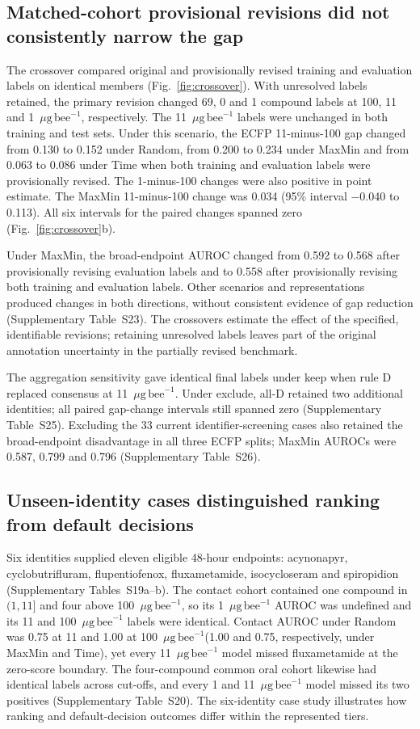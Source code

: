 \documentclass{ieeeaccess}
\newcommand{\ugbee}{\ensuremath{\mu\mathrm{g\,bee}^{-1}}\xspace}
\begin{document}
\subsection{Matched-cohort provisional revisions did not consistently narrow the gap}
The crossover compared original and provisionally revised training and evaluation labels on identical members (Fig.~\ref{fig:crossover}). With unresolved labels retained, the primary revision changed 69, 0 and 1 compound labels at 100, 11 and 1~\ugbee, respectively. The 11~\ugbee labels were unchanged in both training and test sets. Under this scenario, the ECFP 11-minus-100 gap changed from 0.130 to 0.152 under Random, from 0.200 to 0.234 under MaxMin and from 0.063 to 0.086 under Time when both training and evaluation labels were provisionally revised. The 1-minus-100 changes were also positive in point estimate. The MaxMin 11-minus-100 change was 0.034 (95\% interval $-$0.040 to 0.113). All six intervals for the paired changes spanned zero (Fig.~\ref{fig:crossover}b).

Under MaxMin, the broad-endpoint AUROC changed from 0.592 to 0.568 after provisionally revising evaluation labels and to 0.558 after provisionally revising both training and evaluation labels. Other scenarios and representations produced changes in both directions, without consistent evidence of gap reduction (Supplementary Table~S23). The crossovers estimate the effect of the specified, identifiable revisions; retaining unresolved labels leaves part of the original annotation uncertainty in the partially revised benchmark.

The aggregation sensitivity gave identical final labels under keep when rule D replaced consensus at 11~\ugbee. Under exclude, all-D retained two additional identities; all paired gap-change intervals still spanned zero (Supplementary Table~S25). Excluding the 33 current identifier-screening cases also retained the broad-endpoint disadvantage in all three ECFP splits; MaxMin AUROCs were 0.587, 0.799 and 0.796 (Supplementary Table~S26).





\subsection{Unseen-identity cases distinguished ranking from default decisions}
Six identities supplied eleven eligible 48-hour endpoints: acynonapyr, cyclobutrifluram, flupentiofenox, fluxametamide, isocycloseram and spiropidion (Supplementary Tables~S19a--b). The contact cohort contained one compound in \((1,11]\) and four above 100~\ugbee, so its 1~\ugbee AUROC was undefined and its 11 and 100~\ugbee labels were identical. Contact AUROC under Random was 0.75 at 11 and 1.00 at 100~\ugbee (1.00 and 0.75, respectively, under MaxMin and Time), yet every 11~\ugbee model missed fluxametamide at the zero-score boundary. The four-compound common oral cohort likewise had identical labels across cut-offs, and every 1 and 11~\ugbee model missed its two positives (Supplementary Table~S20). The six-identity case study illustrates how ranking and default-decision outcomes differ within the represented tiers.
\end{document}
